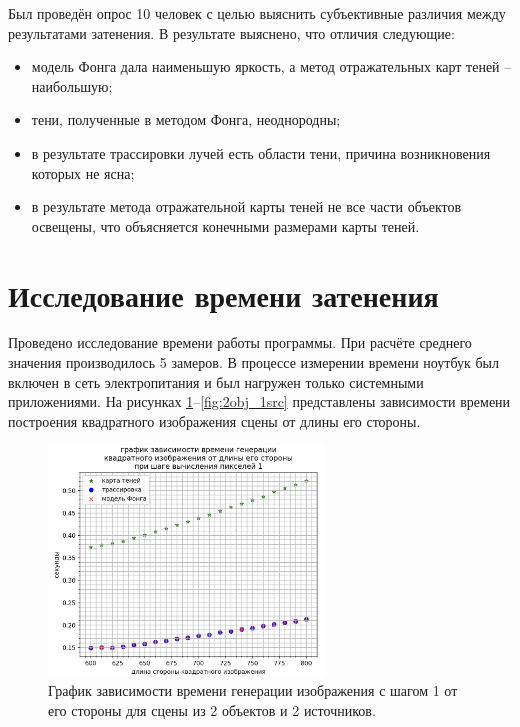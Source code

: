 Был проведён опрос 10 человек с целью выяснить субъективные различия между
результатами затенения.
В результате выяснено, что отличия следующие:
\begin{itemize}
    \item
        модель Фонга дала наименьшую яркость,
        а метод отражательных карт теней -- наибольшую;
    \item тени, полученные в методом Фонга, неоднородны;
    \item
        в результате трассировки лучей есть области тени,
        причина возникновения которых не ясна;
    \item
        в результате метода отражательной карты теней
        не все части объектов освещены,
        что объясняется конечными размерами карты теней.
\end{itemize}

\section{Исследование времени затенения}
Проведено исследование времени работы программы.
При расчёте среднего значения производилось 5 замеров.
В процессе измерении времени ноутбук был включен в сеть электропитания
и был нагружен только системными приложениями.
На рисунках \ref{fig:2obj_2src}--\ref{fig:2obj_1src} представлены зависимости
времени построения квадратного изображения сцены от длины его стороны.

\begin{figure}[H]
	\centering
	\includegraphics[width=0.65\textwidth]{img/2obj_2src.png}
	\caption{
        График зависимости времени генерации изображения с шагом 1 от его стороны
        для сцены из 2 объектов и 2 источников.
    }
	\label{fig:2obj_2src}
\end{figure}

